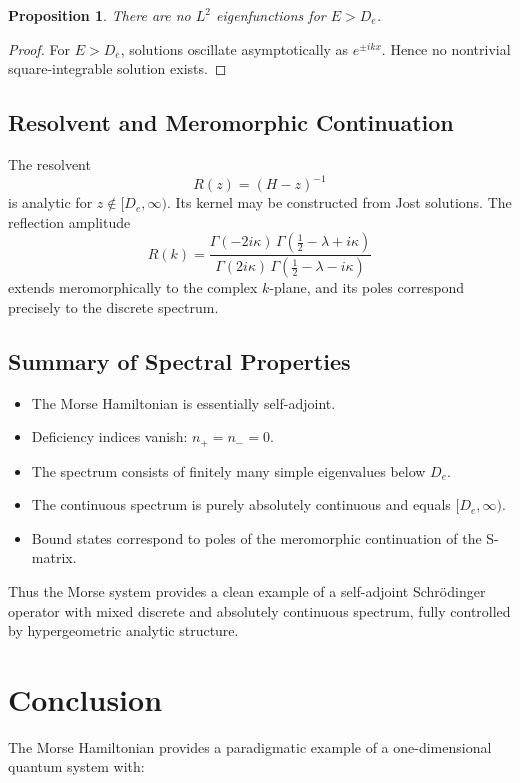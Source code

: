 \documentclass[11pt]{article}
\newtheorem{proposition}{Proposition}
\begin{document}
\begin{proposition}
There are no $L^2$ eigenfunctions for $E>D_e$.
\end{proposition}

\begin{proof}
For $E>D_e$, solutions oscillate asymptotically
as $e^{\pm ikx}$.
Hence no nontrivial square-integrable solution exists.
\end{proof}

\subsection{Resolvent and Meromorphic Continuation}

The resolvent
\[
R(z)=(H-z)^{-1}
\]
is analytic for $z\notin [D_e,\infty)$.
Its kernel may be constructed from Jost solutions.
The reflection amplitude
\[
R(k)=
\frac{\Gamma(-2i\kappa)
\,\Gamma(\frac12-\lambda+i\kappa)}
{\Gamma(2i\kappa)
\,\Gamma(\frac12-\lambda-i\kappa)}
\]
extends meromorphically to the complex $k$-plane,
and its poles correspond precisely to the discrete spectrum.

\subsection{Summary of Spectral Properties}

\begin{itemize}
\item The Morse Hamiltonian is essentially self-adjoint.
\item Deficiency indices vanish: $n_+=n_-=0$.
\item The spectrum consists of finitely many simple eigenvalues
      below $D_e$.
\item The continuous spectrum is purely absolutely continuous
      and equals $[D_e,\infty)$.
\item Bound states correspond to poles of the meromorphic
      continuation of the S-matrix.
\end{itemize}

Thus the Morse system provides a clean example of a
self-adjoint Schr\"odinger operator with mixed
discrete and absolutely continuous spectrum,
fully controlled by hypergeometric analytic structure.


\section{Conclusion}

The Morse Hamiltonian provides a paradigmatic example of a
one-dimensional quantum system with:
\end{document}
